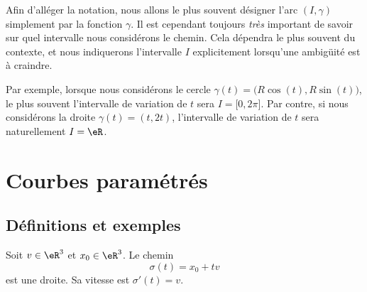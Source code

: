 \newcommand{\CaptionFigExempleArcParam}{Des exemples d'arcs paramétrées. Ceux ne sont pas des graphes.}


\begin{remark}
    Afin d'alléger la notation, nous allons le plus souvent désigner l'arc $(I,\gamma)$ simplement par la fonction $\gamma$. Il est cependant toujours \emph{très} important de savoir sur quel intervalle nous considérons le chemin. Cela dépendra le plus souvent du contexte, et nous indiquerons l'intervalle $I$ explicitement lorsqu'une ambigüité est à craindre.

    Par exemple, lorsque nous considérons le cercle $\gamma(t)=\big( R\cos(t),R\sin(t) \big)$, le plus souvent l'intervalle de variation de $t$ sera $I=\mathopen[ 0 , 2\pi \mathclose]$. Par contre, si nous considérons la droite $\gamma(t)=(t,2t)$, l'intervalle de variation de $t$ sera naturellement $I=\eR$.
\end{remark}

\section{Courbes paramétrés}

\subsection{Définitions et exemples}

\begin{example}
    Soit $v\in\eR^3$ et $x_0\in\eR^3$. Le chemin
    \begin{equation}
        \sigma(t)=x_0+tv
    \end{equation}
    est une droite. Sa vitesse est $\sigma'(t)=v$.
\end{example}

